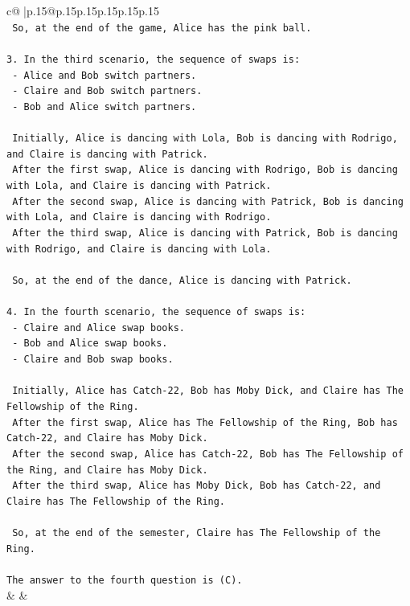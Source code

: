 \documentclass{article}
\begin{document}
{\begin{supertabular}{c@{$\;$}|p{.15\linewidth}@{}p{.15\linewidth}p{.15\linewidth}p{.15\linewidth}p{.15\linewidth}p{.15\linewidth}}
{{{\\ 
\texttt{   So, at the end of the game, Alice has the pink ball.} \\
\\ 
\texttt{3. In the third scenario, the sequence of swaps is:} \\
\texttt{   {-} Alice and Bob switch partners.} \\
\texttt{   {-} Claire and Bob switch partners.} \\
\texttt{   {-} Bob and Alice switch partners.} \\
\\ 
\texttt{   Initially, Alice is dancing with Lola, Bob is dancing with Rodrigo, and Claire is dancing with Patrick.} \\
\texttt{   After the first swap, Alice is dancing with Rodrigo, Bob is dancing with Lola, and Claire is dancing with Patrick.} \\
\texttt{   After the second swap, Alice is dancing with Patrick, Bob is dancing with Lola, and Claire is dancing with Rodrigo.} \\
\texttt{   After the third swap, Alice is dancing with Patrick, Bob is dancing with Rodrigo, and Claire is dancing with Lola.} \\
\\ 
\texttt{   So, at the end of the dance, Alice is dancing with Patrick.} \\
\\ 
\texttt{4. In the fourth scenario, the sequence of swaps is:} \\
\texttt{   {-} Claire and Alice swap books.} \\
\texttt{   {-} Bob and Alice swap books.} \\
\texttt{   {-} Claire and Bob swap books.} \\
\\ 
\texttt{   Initially, Alice has Catch{-}22, Bob has Moby Dick, and Claire has The Fellowship of the Ring.} \\
\texttt{   After the first swap, Alice has The Fellowship of the Ring, Bob has Catch{-}22, and Claire has Moby Dick.} \\
\texttt{   After the second swap, Alice has Catch{-}22, Bob has The Fellowship of the Ring, and Claire has Moby Dick.} \\
\texttt{   After the third swap, Alice has Moby Dick, Bob has Catch{-}22, and Claire has The Fellowship of the Ring.} \\
\\ 
\texttt{   So, at the end of the semester, Claire has The Fellowship of the Ring.} \\
\\ 
\texttt{The answer to the fourth question is (C).} \\
            }
        }
    }
    & & \\ \\


\end{supertabular}}
\end{document}

